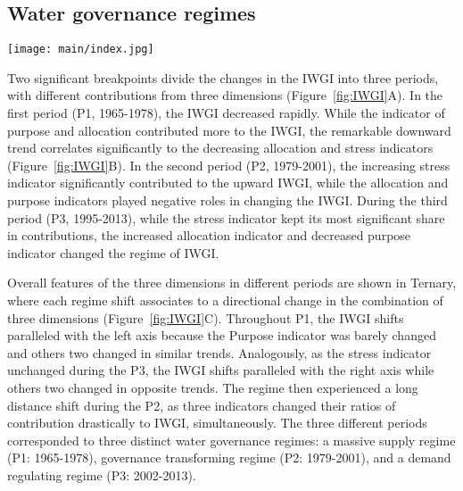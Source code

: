 \subsection{Water governance regimes}
\label{Res.1}

\begin{figure*}[ht!]
	\centering
	\texttt{[image: main/index.jpg]}
	\caption{Changes in the IWGI index.
	\textbf{A,} Change points detection. With significant change points in 1978 and 1994, the IWGI has three different periods.
	\textbf{B,} Contributions of each dimension to the changes of IWGI within each of the three periods. Supply, purpose and allocation were the main positive contributors to P1, P2 and P3.
	\textbf{C,} Combination of contributions across three dimensions in different periods (S: supply; P: purpose; A: allocation). The closer a point is to an angle of the outside triangle, the greater the proportion of the contribution of this dimension.
	The red indicator line in this plot denotes a 1:1 contributions between purpose (P) and allocation (A). When the points are below this line, the contribution ratio of allocation is lower than that of function, and \textit{vice versa}.
	}
	\label{fig:IWGI}
\end{figure*}

Two significant breakpoints divide the changes in the IWGI into three periods, with different contributions from three dimensions (Figure~\ref{fig:IWGI}A).
In the first period (P1, 1965-1978), the IWGI decreased rapidly.
While the indicator of purpose and allocation contributed more to the IWGI, the remarkable downward trend correlates significantly to the decreasing allocation and stress indicators (Figure~\ref{fig:IWGI}B).
In the second period (P2, 1979-2001), the increasing stress indicator significantly contributed to the upward IWGI, while the allocation and purpose indicators played negative roles in changing the IWGI.
During the third period (P3, 1995-2013), while the stress indicator kept its most significant share in contributions, the increased allocation indicator and decreased purpose indicator changed the regime of IWGI.

Overall features of the three dimensions in different periods are shown in Ternary, where each regime shift associates to a directional change in the combination of three dimensions (Figure~\ref{fig:IWGI}C).
Throughout P1, the IWGI shifts paralleled with the left axis because the Purpose indicator was barely changed and others two changed in similar trends.
Analogously, as the stress indicator unchanged during the P3, the IWGI shifts paralleled with the right axis while others two changed in opposite trends.
The regime then experienced a long distance shift during the P2, as three indicators changed their ratios of contribution drastically to IWGI, simultaneously.
The three different periods corresponded to three distinct water governance regimes: a massive supply regime (P1: 1965-1978), governance transforming regime (P2: 1979-2001), and a demand regulating regime (P3: 2002-2013).


